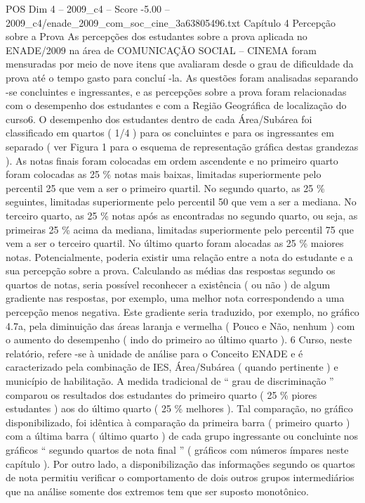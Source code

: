 \begin{textsample}{POS Dim 4 – 2009\_c4 – Score -5.00 – 2009\_c4/enade\_2009\_com\_soc\_cine\_3a63805496.txt}  \label{ex:f4_pos_329}
Capítulo 4 Percepção sobre a Prova As percepções dos estudantes sobre a prova aplicada no ENADE/2009 na área de COMUNICAÇÃO SOCIAL – CINEMA foram mensuradas por meio de nove itens que avaliaram desde o grau de dificuldade da prova até o tempo gasto para concluí -la.
As questões foram analisadas separando -se concluintes e ingressantes, e as percepções sobre a prova foram relacionadas com o desempenho dos estudantes e com a Região Geográfica de localização do curso6.
O desempenho dos estudantes dentro de cada Área/Subárea foi classificado em quartos ( 1/4 ) para os concluintes e para os ingressantes em separado ( ver Figura 1 para o esquema de representação gráfica destas grandezas ).
As notas finais foram colocadas em ordem ascendente e no primeiro quarto foram colocadas as 25 \% notas mais baixas, limitadas superiormente pelo percentil 25 que vem a ser o primeiro quartil.
No segundo quarto, as 25 \% seguintes, limitadas superiormente pelo percentil 50 que vem a ser a mediana.
No terceiro quarto, as 25 \% notas após as encontradas no segundo quarto, ou seja, as primeiras 25 \% acima da mediana, limitadas superiormente pelo percentil 75 que vem a ser o terceiro quartil.
No último quarto foram alocadas as 25 \% maiores notas.
Potencialmente, poderia existir uma relação entre a nota do estudante e a sua percepção sobre a prova.
Calculando as médias das respostas segundo os quartos de notas, seria possível reconhecer a existência ( ou não ) de algum gradiente nas respostas, por exemplo, uma melhor nota correspondendo a uma percepção menos negativa.
Este gradiente seria traduzido, por exemplo, no gráfico 4.7a, pela diminuição das áreas laranja e vermelha ( Pouco e Não, nenhum ) com o aumento do desempenho ( indo do primeiro ao último quarto ). 6 Curso, neste relatório, refere -se à unidade de análise para o Conceito ENADE e é caracterizado pela combinação de IES, Área/Subárea ( quando pertinente ) e município de habilitação.
A medida tradicional de “ grau de discriminação ” comparou os resultados dos estudantes do primeiro quarto ( 25 \% piores estudantes ) aos do último quarto ( 25 \% melhores ).
Tal comparação, no gráfico disponibilizado, foi idêntica à comparação da primeira barra ( primeiro quarto ) com a última barra ( último quarto ) de cada grupo ingressante ou concluinte nos gráficos “ segundo quartos de nota final ” ( gráficos com números ímpares neste capítulo ).
Por outro lado, a disponibilização das informações segundo os quartos de nota permitiu verificar o comportamento de dois outros grupos intermediários que na análise somente dos extremos tem que ser suposto monotônico.

\end{textsample}
